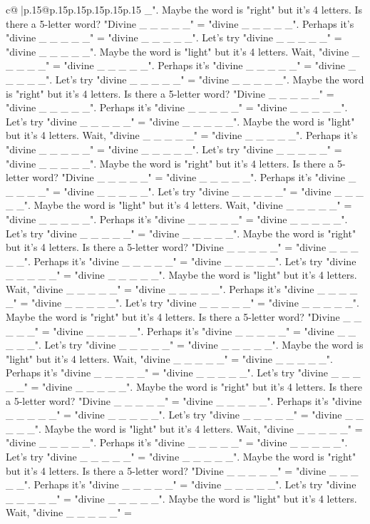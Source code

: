 \documentclass{article}
\begin{document}
{\begin{supertabular}{c@{$\;$}|p{.15\linewidth}@{}p{.15\linewidth}p{.15\linewidth}p{.15\linewidth}p{.15\linewidth}p{.15\linewidth}}
{{{\_". Maybe the word is "right" but it's 4 letters. Is there a 5{-}letter word? "Divine \_ \_ \_ \_ \_" = "divine \_ \_ \_ \_ \_". Perhaps it's "divine \_ \_ \_ \_ \_" = "divine \_ \_ \_ \_ \_". Let's try "divine \_ \_ \_ \_ \_" = "divine \_ \_ \_ \_ \_". Maybe the word is "light" but it's 4 letters. Wait, "divine \_ \_ \_ \_ \_" = "divine \_ \_ \_ \_ \_". Perhaps it's "divine \_ \_ \_ \_ \_" = "divine \_ \_ \_ \_ \_". Let's try "divine \_ \_ \_ \_ \_" = "divine \_ \_ \_ \_ \_". Maybe the word is "right" but it's 4 letters. Is there a 5{-}letter word? "Divine \_ \_ \_ \_ \_" = "divine \_ \_ \_ \_ \_". Perhaps it's "divine \_ \_ \_ \_ \_" = "divine \_ \_ \_ \_ \_". Let's try "divine \_ \_ \_ \_ \_" = "divine \_ \_ \_ \_ \_". Maybe the word is "light" but it's 4 letters. Wait, "divine \_ \_ \_ \_ \_" = "divine \_ \_ \_ \_ \_". Perhaps it's "divine \_ \_ \_ \_ \_" = "divine \_ \_ \_ \_ \_". Let's try "divine \_ \_ \_ \_ \_" = "divine \_ \_ \_ \_ \_". Maybe the word is "right" but it's 4 letters. Is there a 5{-}letter word? "Divine \_ \_ \_ \_ \_" = "divine \_ \_ \_ \_ \_". Perhaps it's "divine \_ \_ \_ \_ \_" = "divine \_ \_ \_ \_ \_". Let's try "divine \_ \_ \_ \_ \_" = "divine \_ \_ \_ \_ \_". Maybe the word is "light" but it's 4 letters. Wait, "divine \_ \_ \_ \_ \_" = "divine \_ \_ \_ \_ \_". Perhaps it's "divine \_ \_ \_ \_ \_" = "divine \_ \_ \_ \_ \_". Let's try "divine \_ \_ \_ \_ \_" = "divine \_ \_ \_ \_ \_". Maybe the word is "right" but it's 4 letters. Is there a 5{-}letter word? "Divine \_ \_ \_ \_ \_" = "divine \_ \_ \_ \_ \_". Perhaps it's "divine \_ \_ \_ \_ \_" = "divine \_ \_ \_ \_ \_". Let's try "divine \_ \_ \_ \_ \_" = "divine \_ \_ \_ \_ \_". Maybe the word is "light" but it's 4 letters. Wait, "divine \_ \_ \_ \_ \_" = "divine \_ \_ \_ \_ \_". Perhaps it's "divine \_ \_ \_ \_ \_" = "divine \_ \_ \_ \_ \_". Let's try "divine \_ \_ \_ \_ \_" = "divine \_ \_ \_ \_ \_". Maybe the word is "right" but it's 4 letters. Is there a 5{-}letter word? "Divine \_ \_ \_ \_ \_" = "divine \_ \_ \_ \_ \_". Perhaps it's "divine \_ \_ \_ \_ \_" = "divine \_ \_ \_ \_ \_". Let's try "divine \_ \_ \_ \_ \_" = "divine \_ \_ \_ \_ \_". Maybe the word is "light" but it's 4 letters. Wait, "divine \_ \_ \_ \_ \_" = "divine \_ \_ \_ \_ \_". Perhaps it's "divine \_ \_ \_ \_ \_" = "divine \_ \_ \_ \_ \_". Let's try "divine \_ \_ \_ \_ \_" = "divine \_ \_ \_ \_ \_". Maybe the word is "right" but it's 4 letters. Is there a 5{-}letter word? "Divine \_ \_ \_ \_ \_" = "divine \_ \_ \_ \_ \_". Perhaps it's "divine \_ \_ \_ \_ \_" = "divine \_ \_ \_ \_ \_". Let's try "divine \_ \_ \_ \_ \_" = "divine \_ \_ \_ \_ \_". Maybe the word is "light" but it's 4 letters. Wait, "divine \_ \_ \_ \_ \_" = "divine \_ \_ \_ \_ \_". Perhaps it's "divine \_ \_ \_ \_ \_" = "divine \_ \_ \_ \_ \_". Let's try "divine \_ \_ \_ \_ \_" = "divine \_ \_ \_ \_ \_". Maybe the word is "right" but it's 4 letters. Is there a 5{-}letter word? "Divine \_ \_ \_ \_ \_" = "divine \_ \_ \_ \_ \_". Perhaps it's "divine \_ \_ \_ \_ \_" = "divine \_ \_ \_ \_ \_". Let's try "divine \_ \_ \_ \_ \_" = "divine \_ \_ \_ \_ \_". Maybe the word is "light" but it's 4 letters. Wait, "divine \_ \_ \_ \_ \_" = }}}
\end{supertabular}}
\end{document}
